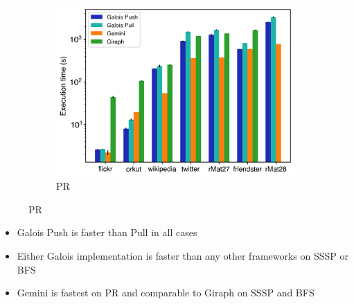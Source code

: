 \documentclass{meetings}
\begin{document}
\begin{figure}[h]
\begin{subfigure}{0.32\textwidth}
		\includegraphics[width=\linewidth]{../../plots/distributedPR_execTime.png}
		\caption{PR}
		\label{fig:distributedSSSP_exec}
	\end{subfigure}
\end{figure}
\begin{itemize}
	\item Galois Push is faster than Pull in all cases
	\item Either Galois implementation is faster than any other frameworks on SSSP or BFS
	\item Gemini is fastest on PR and comparable to Giraph on SSSP and BFS
\end{itemize}


\end{document}
